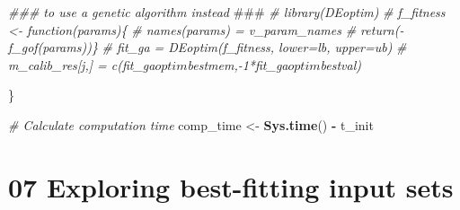\documentclass[
]{article}
\newenvironment{Shaded}{\begin{snugshade}}{\end{snugshade}}
\newcommand{\AlertTok}[1]{\textcolor[rgb]{0.94,0.16,0.16}{#1}}
\newcommand{\CommentTok}[1]{\textcolor[rgb]{0.56,0.35,0.01}{\textit{#1}}}
\newcommand{\KeywordTok}[1]{\textcolor[rgb]{0.13,0.29,0.53}{\textbf{#1}}}
\newcommand{\NormalTok}[1]{#1}
\newcommand{\OperatorTok}[1]{\textcolor[rgb]{0.81,0.36,0.00}{\textbf{#1}}}
\newcommand{\StringTok}[1]{\textcolor[rgb]{0.31,0.60,0.02}{#1}}
\begin{document}
\begin{Shaded}
\begin{Highlighting}[]
  \CommentTok{### to use a genetic algorithm instead }\AlertTok{###}
  \CommentTok{# library(DEoptim)}
  \CommentTok{# f_fitness <- function(params)\{}
  \CommentTok{#   names(params) = v_param_names}
  \CommentTok{#   return(-f_gof(params))\}}
  \CommentTok{# fit_ga = DEoptim(f_fitness, lower=lb, upper=ub)}
  \CommentTok{# m_calib_res[j,] = c(fit_ga$optim$bestmem,-1*fit_ga$optim$bestval)}
  
\NormalTok{\}}

\CommentTok{# Calculate computation time}
\NormalTok{comp_time <-}\StringTok{ }\KeywordTok{Sys.time}\NormalTok{() }\OperatorTok{-}\StringTok{ }\NormalTok{t_init}
\end{Highlighting}
\end{Shaded}

\hypertarget{exploring-best-fitting-input-sets}{%
\section{07 Exploring best-fitting input
sets}\label{exploring-best-fitting-input-sets}}
\end{document}
